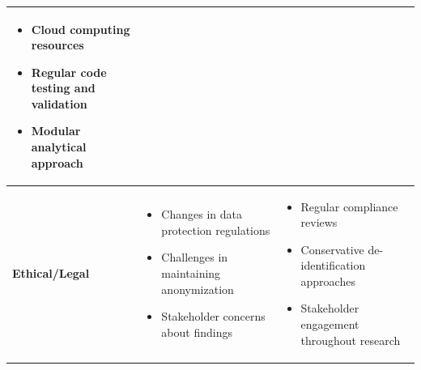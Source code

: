 \documentclass[12pt,a4paper,landscape]{article}
\begin{document}
\begin{table}[H]
\begin{tabular}{p{3cm}p{6cm}p{6cm}}
\begin{itemize}[leftmargin=*]
        \item Cloud computing resources
        \item Regular code testing and validation
        \item Modular analytical approach
    \end{itemize} \\
    \midrule
    \textbf{Ethical/Legal} & 
    \begin{itemize}[leftmargin=*]
        \item Changes in data protection regulations
        \item Challenges in maintaining anonymization
        \item Stakeholder concerns about findings
    \end{itemize} & 
    \begin{itemize}[leftmargin=*]
        \item Regular compliance reviews
        \item Conservative de-identification approaches
        \item Stakeholder engagement throughout research
    \end{itemize} \\
    \bottomrule
    \end{tabular}
\end{table}
\end{document}
